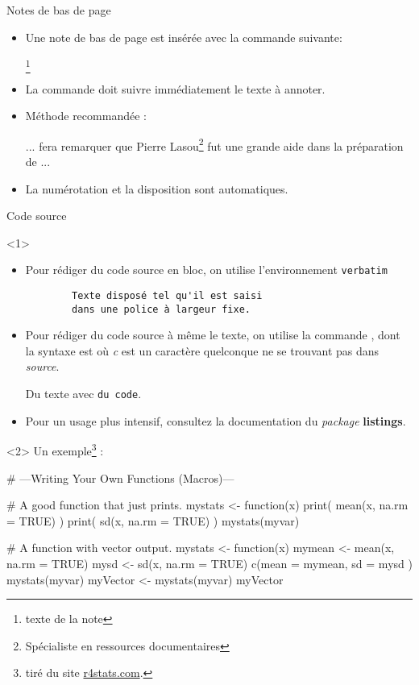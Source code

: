 \begin{frame}[fragile,c]{Notes de bas de page}
\begin{itemize}
\item Une note de bas de page est insérée avec la commande suivante:
\begin{codesource}
	\footnote{texte de la note}
\end{codesource}
\item La commande doit suivre immédiatement le texte à annoter.
\item Méthode recommandée :
\begin{codesource}
	... fera remarquer que Pierre Lasou\footnote{%
		Spécialiste en ressources documentaires} %
	fut une grande aide dans la préparation de ...
\end{codesource}
\item La numérotation et la disposition sont automatiques.
\end{itemize}
\end{frame}

\begin{frame}[fragile,c]{Code source}
\begin{onlyenv}<1>
\begin{itemize}
\item Pour rédiger du code source en bloc, on utilise l'environnement \texttt{verbatim}
\begin{codesource}
	\begin{verbatim}
        Texte disposé tel qu'il est saisi
        dans une police à largeur fixe.
	\end{verbatim}
\end{codesource}
\item Pour rédiger du code source à même le texte, on utilise la commande , dont la
syntaxe est  où \emph{c} est un caractère quelconque ne se trouvant pas dans \emph{source}.
\begin{codesource}
	Du texte avec \verb|du code|.
\end{codesource}
\item Pour un usage plus intensif, consultez la documentation du \emph{package} \textbf{listings}.
\end{itemize}
\end{onlyenv}

\begin{onlyenv}<2>
Un exemple\footnote{tiré du site \href{http://r4stats.com/examples/programming/}{r4stats.com}.} :
\begin{codesource}
# ---Writing Your Own Functions (Macros)---

# A good function that just prints.
mystats <- function(x) {
	print( mean(x, na.rm = TRUE) )
	print(   sd(x, na.rm = TRUE) )
}
mystats(myvar)

# A function with vector output.
mystats  <- function(x) {
	mymean <- mean(x, na.rm = TRUE)
	mysd   <-   sd(x, na.rm = TRUE)
	c(mean = mymean, sd = mysd )
}
mystats(myvar)
myVector <- mystats(myvar)
myVector
\end{codesource}
\end{onlyenv}
\end{frame}